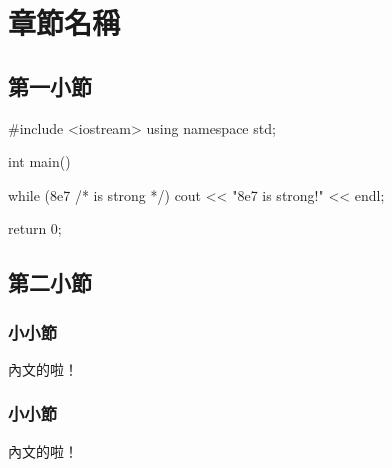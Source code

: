 \chapter{章節名稱}

\section{第一小節}







\pagebreak

\begin{C++}
#include <iostream>
using namespace std;

int main() {
	while (8e7 /* is strong */) {
		cout << "8e7 is strong!" << endl;
	}

	return 0;
}
\end{C++}

\section{第二小節}

\subsection{小小節}
內文的啦！

\subsection{小小節}
內文的啦！
